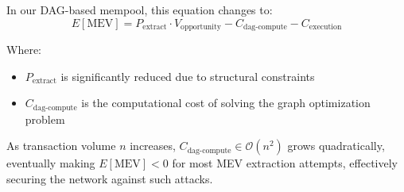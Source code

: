 \documentclass[12pt]{article}
\begin{document}
In our DAG-based mempool, this equation changes to:
\begin{equation}
E[\text{MEV}] = P_{\text{extract}} \cdot V_{\text{opportunity}} - C_{\text{dag-compute}} - C_{\text{execution}}
\end{equation}

Where:
\begin{itemize}
\item $P_{\text{extract}}$ is significantly reduced due to structural constraints
\item $C_{\text{dag-compute}}$ is the computational cost of solving the graph optimization problem
\end{itemize}

As transaction volume $n$ increases, $C_{\text{dag-compute}} \in \mathcal{O}(n^2)$ grows quadratically, eventually making $E[\text{MEV}] < 0$ for most MEV extraction attempts, effectively securing the network against such attacks.


\nocite{*}
\printbibliography
\end{document}
